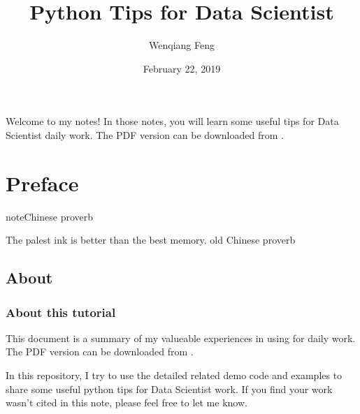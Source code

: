 \documentclass[letterpaper,12pt,english]{sphinxmanual}
\title{Python Tips for Data Scientist}
\date{February 22, 2019}
\author{Wenqiang Feng}
\begin{document}
\maketitle
\sphinxtableofcontents
{}\label{\detokenize{index::doc}}\label{\detokenize{index:index}}\begin{quote}
\label{\detokenize{index:fig-logo}}\begin{figure}[htbp]
\centering

\noindent{}
\label{\detokenize{index:fig-logo}}\end{figure}
\end{quote}

Welcome to my  notes! In those notes, you will learn some useful tips for Data Scientist daily work. The PDF version can be downloaded from .




\chapter{Preface}
\label{\detokenize{preface:id1}}\label{\detokenize{preface::doc}}\label{\detokenize{preface:contents}}\label{\detokenize{preface:preface}}
\begin{sphinxadmonition}{note}{Chinese proverb}

The palest ink is better than the best memory. \textendash{} old Chinese proverb
\end{sphinxadmonition}


\section{About}
\label{\detokenize{preface:about}}

\subsection{About this tutorial}
\label{\detokenize{preface:about-this-tutorial}}
This document is a summary of my valueable experiences in using  for  daily work. The PDF version can be downloaded from . 

In this repository, I try to use the detailed  related demo code and
examples to share some useful python tips for Data Scientist work. If you find your work wasn’t cited in this note, please feel free to let me know.
\end{document}
